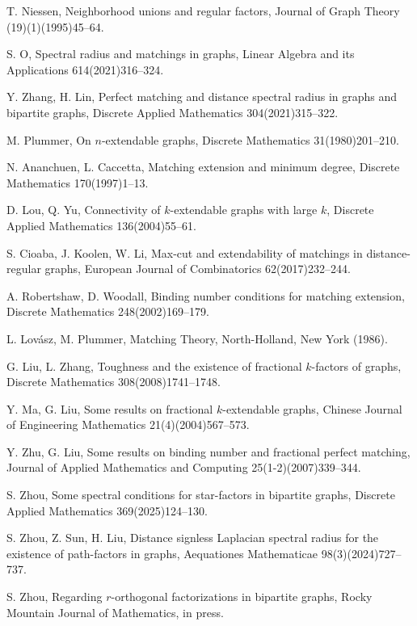 \documentclass[10pt]{article}
\numberwithin{equation}{section}
\begin{document}
\begin{thebibliography}{9999}
 T. Niessen, Neighborhood unions and regular factors, Journal of Graph Theory (19)(1)(1995)45--64.

 S. O, Spectral radius and matchings in graphs, Linear Algebra and its Applications 614(2021)316--324.

 Y. Zhang, H. Lin, Perfect matching and distance spectral radius in graphs and bipartite graphs, Discrete Applied Mathematics 304(2021)315--322.

 M. Plummer, On $n$-extendable graphs, Discrete Mathematics 31(1980)201--210.

 N. Ananchuen, L. Caccetta, Matching extension and minimum degree, Discrete Mathematics 170(1997)1--13.

 D. Lou, Q. Yu, Connectivity of $k$-extendable graphs with large $k$, Discrete Applied Mathematics 136(2004)55--61.

 S. Cioaba, J. Koolen, W. Li, Max-cut and extendability of matchings in distance-regular graphs, European Journal of Combinatorics 62(2017)232--244.

 A. Robertshaw, D. Woodall, Binding number conditions for matching extension, Discrete Mathematics 248(2002)169--179.

 L. Lov\'asz, M. Plummer, Matching Theory, North-Holland, New York (1986).

 G. Liu, L. Zhang, Toughness and the existence of fractional $k$-factors of graphs, Discrete Mathematics 308(2008)1741--1748.

 Y. Ma, G. Liu, Some results on fractional $k$-extendable graphs, Chinese Journal of Engineering Mathematics 21(4)(2004)567--573.

 Y. Zhu, G. Liu, Some results on binding number and fractional perfect matching, Journal of Applied Mathematics and Computing 25(1-2)(2007)339--344.

 S. Zhou, Some spectral conditions for star-factors in bipartite graphs, Discrete Applied Mathematics 369(2025)124--130.

 S. Zhou, Z. Sun, H. Liu, Distance signless Laplacian spectral radius for the existence of path-factors in graphs, Aequationes
Mathematicae 98(3)(2024)727--737.

 S. Zhou, Regarding $r$-orthogonal factorizations in bipartite graphs, Rocky Mountain Journal of Mathematics, in press.


\end{thebibliography}
\end{document}
